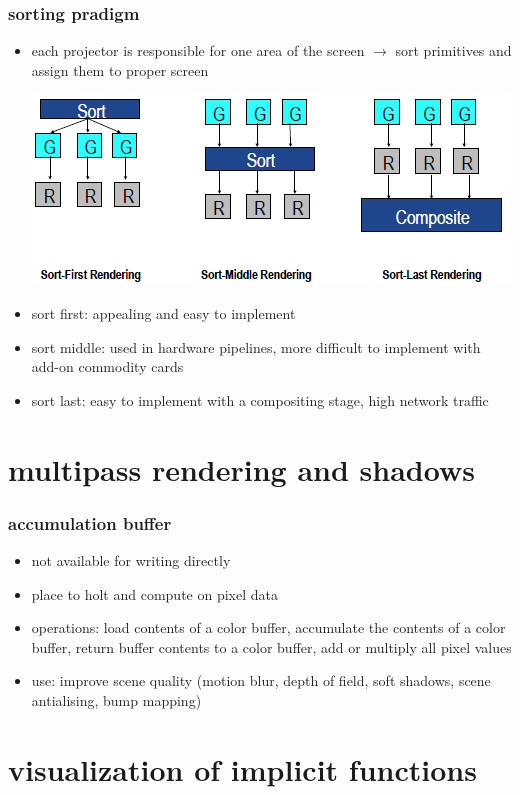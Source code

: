 \documentclass[11pt,a4paper]{article}
\begin{document}
\subsubsection{sorting pradigm}
\begin{itemize}
	\item each projector is responsible for one area of the screen $\rightarrow$ sort primitives and assign them to proper screen	
	\begin{center}
		\includegraphics[scale=1]{pictures/sort.PNG}
	\end{center}
	\item sort first: appealing and easy to implement
	\item sort middle: used in hardware pipelines, more difficult to implement with add-on commodity cards
	\item sort last: easy to implement with a compositing stage, high network traffic
\end{itemize}
\section{multipass rendering and shadows}
\subsubsection{accumulation buffer}
\begin{itemize}
	\item not available for writing directly
	\item place to holt and compute on pixel data
	\item operations: load contents of a color buffer, accumulate the contents of a color buffer, return buffer contents to a color buffer, add or multiply all pixel values
	\item use: improve scene quality (motion blur, depth of field, soft shadows, scene antialising, bump mapping)
\end{itemize}

\section{visualization of implicit functions}
\end{document}
